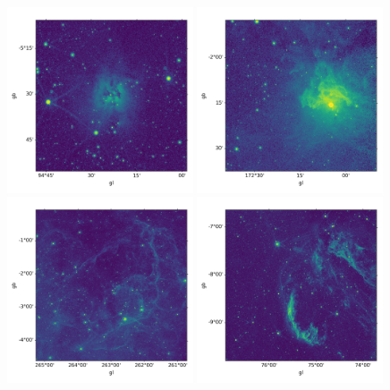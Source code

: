 \documentclass[12pt, preprint]{aastex61}
\begin{document}
\begin{figure}[p]
\begin{center}
\includegraphics[width=0.49\textwidth]{figures/cocoon}
\includegraphics[width=0.49\textwidth]{figures/FlamingStar}
\includegraphics[width=0.49\textwidth]{figures/vela}
\includegraphics[width=0.49\textwidth]{figures/cygnusloop}

\end{center}
\end{figure}
\end{document}

